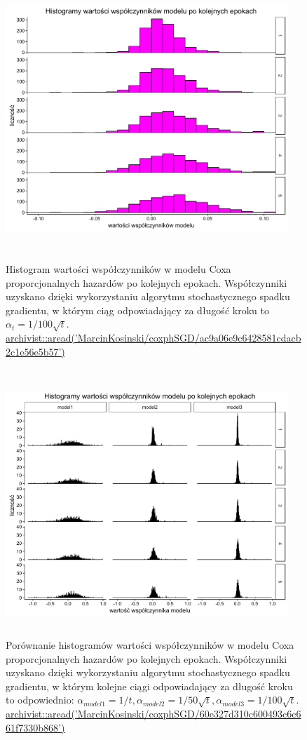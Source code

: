 \begin{figure}[!ht]
\centering
\includegraphics[width=0.95\textwidth, height = 280pt]{Obrazki/analiza/hist_overt_100sqrt_t.pdf}
\caption{\label{fig:hist3} Histogram wartości współczynników w modelu Coxa proporcjonalnych hazardów po kolejnych epokach. Współczynniki uzyskano dzięki wykorzystaniu algorytmu stochastycznego spadku gradientu, w którym ciąg odpowiadający za długość kroku to $\alpha_t = 1/100\sqrt{t}$.
\href{https://github.com/MarcinKosinski/coxphSGD/blob/master/gallery/ac9a06e9c6428581cdacb2c1e56e5b57.rda?raw=true}{archivist::aread('MarcinKosinski/coxphSGD/ac9a06e9c6428581cdacb2c1e56e5b57')}}
\ \\
\includegraphics[width=0.95\textwidth, height = 260pt]{Obrazki/analiza/hist_together.pdf}
\caption{\label{fig:hist4} Porównanie histogramów wartości współczynników w modelu Coxa proporcjonalnych hazardów po kolejnych epokach. Współczynniki uzyskano dzięki wykorzystaniu algorytmu stochastycznego spadku gradientu, w którym kolejne ciągi odpowiadający za długość kroku to odpowiednio: $\alpha_{model1} = 1/t, \alpha_{model2} = 1/50\sqrt{t},  \alpha_{model3} = 1/100\sqrt{t}$. \\
\href{https://github.com/MarcinKosinski/coxphSGD/blob/master/gallery/60e327d310c600493c6c661f7330b868.rda?raw=true}{archivist::aread('MarcinKosinski/coxphSGD/60e327d310c600493c6c661f7330b868')}}
\end{figure}







